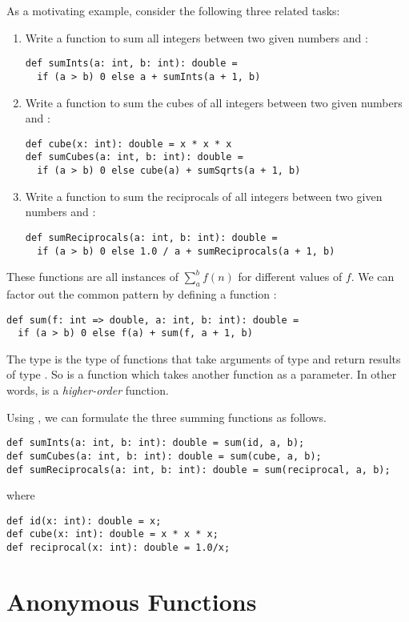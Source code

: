 \documentclass[a4paper,12pt,twoside,titlepage]{book}
\begin{document}
As a motivating example, consider the following three related tasks:
\begin{enumerate}
\item
Write a function to sum all integers between two given numbers  and :
\begin{lstlisting}
def sumInts(a: int, b: int): double =
  if (a > b) 0 else a + sumInts(a + 1, b)
\end{lstlisting}
\item 
Write a function to sum the cubes of all integers between two given numbers 
 and :
\begin{lstlisting}
def cube(x: int): double = x * x * x
def sumCubes(a: int, b: int): double =
  if (a > b) 0 else cube(a) + sumSqrts(a + 1, b)
\end{lstlisting}
\item
Write a function to sum the reciprocals of all integers between two given numbers 
 and :
\begin{lstlisting}
def sumReciprocals(a: int, b: int): double =
  if (a > b) 0 else 1.0 / a + sumReciprocals(a + 1, b)
\end{lstlisting}
\end{enumerate}
These functions are all instances of
\(\sum^b_a f(n)\) for different values of $f$. 
We can factor out the common pattern by defining a function :
\begin{lstlisting}
def sum(f: int => double, a: int, b: int): double =
  if (a > b) 0 else f(a) + sum(f, a + 1, b)
\end{lstlisting}
The type  is the type of functions that
take arguments of type  and return results of type
. So  is a function which takes another function as 
a parameter. In other words,  is a {\em higher-order}
function.

Using , we can formulate the three summing functions as
follows.
\begin{lstlisting}
def sumInts(a: int, b: int): double = sum(id, a, b);
def sumCubes(a: int, b: int): double = sum(cube, a, b);
def sumReciprocals(a: int, b: int): double = sum(reciprocal, a, b);
\end{lstlisting}
where
\begin{lstlisting}
def id(x: int): double = x;
def cube(x: int): double = x * x * x;
def reciprocal(x: int): double = 1.0/x;
\end{lstlisting}

\section{Anonymous Functions}
\end{document}
